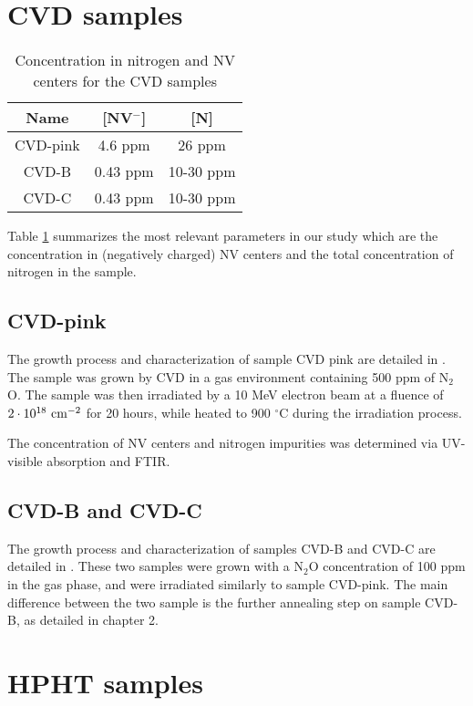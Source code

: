 \documentclass[a4paper, 11pt]{report}
\begin{document}
\section{CVD samples}
\begin{table}[htbp]
\centering
\caption{Concentration in nitrogen and NV centers for the CVD samples}
\label{Table samples CVD}
\begin{tabular}{c|cc}
\toprule
Name & [NV$^-$] & [N] \\
\midrule
CVD-pink & 4.6 ppm & 26 ppm \\
CVD-B & 0.43 ppm & 10-30 ppm \\
CVD-C & 0.43 ppm & 10-30 ppm \\

\bottomrule
\end{tabular}
\end{table}
Table \ref{Table samples CVD} summarizes the most relevant parameters in our study which are the concentration in (negatively charged) NV centers and the total concentration of nitrogen in the sample.
\subsection{CVD-pink}
The growth process and characterization of sample CVD pink are detailed in \citep{tallaire2020high}. The sample was grown by CVD in a gas environment containing 500 ppm of N$_2$O. The sample was then irradiated by a 10 MeV electron beam at a fluence of $2\cdot 10^{18}\ \rm cm^{-2}$ for 20 hours, while heated to 900 $^\circ$C during the irradiation process.

The concentration of NV centers and nitrogen impurities was determined via UV-visible absorption and FTIR.

\subsection{CVD-B and CVD-C}
The growth process and characterization of samples CVD-B and CVD-C are detailed in \citep{ngambou2022improving}. These two samples were grown with a N$_2$O concentration of 100 ppm in the gas phase, and were irradiated similarly to sample CVD-pink. The main difference between the two sample is the further annealing step on sample CVD-B, as detailed in chapter 2.

\section{HPHT samples}
\end{document}

